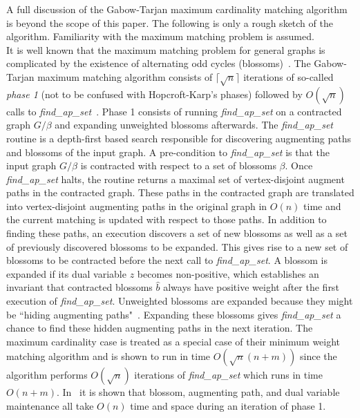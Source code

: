 \documentclass{llncs}
\begin{document}
A full discussion of the Gabow-Tarjan maximum cardinality matching algorithm~\cite{GabowT91} is beyond the scope of this paper.  The following is only a rough sketch of the algorithm.  Familiarity with the maximum matching problem is assumed.\\

\noindent It is well known that the maximum matching problem for general graphs is complicated by the existence of alternating odd cycles (blossoms)~\cite{Edmonds65}.  
The Gabow-Tarjan maximum matching algorithm consists of $\lceil \sqrt{n} \rceil$ iterations of so-called \emph{phase 1} (not to be confused with Hopcroft-Karp's phases) followed by $O(\sqrt{n})$ calls to \emph{find\_ap\_set}~\cite{GabowT91}.  
Phase 1 consists of running \emph{find\_ap\_set} on a contracted graph $G/\beta$ and expanding unweighted blossoms afterwards. 
The \emph{find\_ap\_set} routine is a depth-first based search responsible for discovering augmenting paths and blossoms of the input graph. A pre-condition to \emph{find\_ap\_set} is that the input graph $G/\beta$ is contracted with respect to a set of blossoms $\beta$.  Once \emph{find\_ap\_set} halts, the routine returns a maximal set of vertex-disjoint augment paths in the contracted graph.  These paths in the contracted graph are translated into vertex-disjoint augmenting paths in the original graph in $O(n)$ time and the current matching is updated with respect to those paths.  In addition to finding these paths, an execution discovers a set of new blossoms as well as a set of previously discovered blossoms to be expanded. This gives rise to a new set of blossoms to be contracted before the next call to \emph{find\_ap\_set}.  A blossom is expanded if its dual variable $z$ becomes non-positive, which establishes an invariant that contracted blossoms $\hat{b}$ always have positive weight after the first execution of \emph{find\_ap\_set}.  Unweighted blossoms are expanded because they might be ``hiding augmenting paths"~\cite{Edmonds65}.  Expanding these blossoms gives \emph{find\_ap\_set} a chance to find these hidden augmenting paths in the next iteration. The maximum cardinality case is treated as a special case of their minimum weight matching algorithm and is shown to run in time $O(\sqrt{n}(n+m))$ since the algorithm performs $O(\sqrt{n})$ iterations of \emph{find\_ap\_set} which runs in time $O(n+m)$. 
In~\cite{GabowT91} it is shown that blossom, augmenting path, and dual variable maintenance all take $O(n)$ time and space during an iteration of phase 1.  
\end{document}
